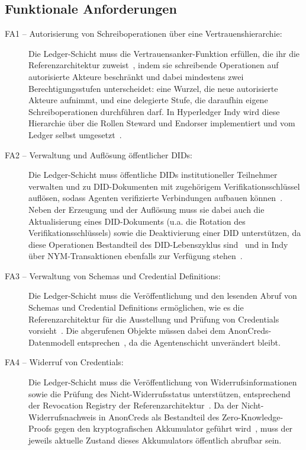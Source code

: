 \subsection{Funktionale Anforderungen}
\label{subsec:funktionale-anforderungen}
\begin{description}
  \item[FA1 -- Autorisierung von Schreiboperationen über eine Vertrauenshierarchie:] Die Ledger-Schicht muss die Vertrauensanker-Funktion erfüllen, die ihr die Referenzarchitektur zuweist~\cite{erler2023}, indem sie schreibende Operationen auf autorisierte Akteure beschränkt und dabei mindestens zwei Berechtigungsstufen unterscheidet: eine Wurzel, die neue autorisierte Akteure aufnimmt, und eine delegierte Stufe, die daraufhin eigene Schreiboperationen durchführen darf. In Hyperledger Indy wird diese Hierarchie über die Rollen Steward und Endorser implementiert und vom Ledger selbst umgesetzt~\cite{torongo2023}.
  \item[FA2 -- Verwaltung und Auflösung öffentlicher DIDs:] Die Ledger-Schicht muss öffentliche DIDs institutioneller Teilnehmer verwalten und zu DID-Dokumenten mit zugehörigem Verifikationsschlüssel auflösen, sodass Agenten verifizierte Verbindungen aufbauen können~\cite{erler2023}. Neben der Erzeugung und der Auflösung muss sie dabei auch die Aktualisierung eines DID-Dokuments (u.a. die Rotation des Verifikationsschlüssels) sowie die Deaktivierung einer DID unterstützen, da diese Operationen Bestandteil des DID-Lebenszyklus sind~\cite{mazzocca2025} und in Indy über NYM-Transaktionen ebenfalls zur Verfügung stehen~\cite{torongo2023}.
  \item[FA3 -- Verwaltung von Schemas und Credential Definitions:] Die Ledger-Schicht muss die Veröffentlichung und den lesenden Abruf von Schemas und Credential Definitions ermöglichen, wie es die Referenzarchitektur für die Ausstellung und Prüfung von Credentials vorsieht~\cite{erler2023}. Die abgerufenen Objekte müssen dabei dem AnonCreds-Datenmodell entsprechen~\cite{anoncredsspec}, da die Agentenschicht unverändert bleibt.
  \item[FA4 -- Widerruf von Credentials:] Die Ledger-Schicht muss die Veröffentlichung von Widerrufsinformationen sowie die Prüfung des Nicht-Widerrufsstatus unterstützen, entsprechend der Revocation Registry der Referenzarchitektur~\cite{erler2023}. Da der Nicht-Widerrufsnachweis in AnonCreds als Bestandteil des Zero-Knowledge-Proofs gegen den kryptografischen Akkumulator geführt wird~\cite{anoncredsspec}, muss der jeweils aktuelle Zustand dieses Akkumulators öffentlich abrufbar sein.

\end{description}
